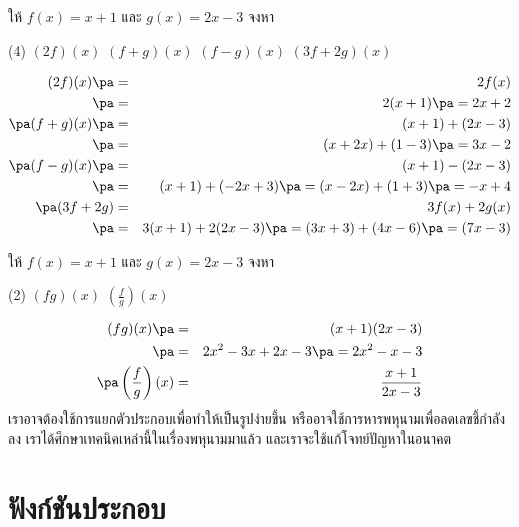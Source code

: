 \begin{frame}[t]
\begin{ex}
ให้ $f(x) = x+1$ และ $g(x) = 2x-3$ จงหา
\begin{tasks}(4)
\task $(2f)(x)$
\task $(f+g)(x)$ 
\task $(f - g)(x)$
\task $(3f + 2g)(x)$
\end{tasks}
\end{ex}
\begin{sol}
\begin{eqnarray*}
(2f)(x) \pa &=& 2f(x)  \\ \pa
&=& 2(x+1) \pa = 2x+2 \\ \pa
(f+g)(x) \pa &=& (x+1) + (2x-3)  \\ \pa
&=& (x+2x) + (1-3) \pa = 3x-2 \\ \pa
(f-g)(x) \pa &=& (x+1) - (2x-3) \\ \pa
&=& (x+1) + (-2x + 3) \pa = (x-2x) + (1+3) \pa = -x+4 \\ \pa
(3f + 2g) &=& 3f(x) + 2g(x) \\ \pa
&=& 3(x+1) + 2(2x-3) \pa = (3x+3) + (4x-6) \pa = (7x-3)
\end{eqnarray*}
\end{sol}
\end{frame}


\begin{frame}[t]
\begin{ex}
ให้ $f(x) = x+1$ และ $g(x) = 2x-3$ จงหา
\begin{tasks}(2)
\task $(fg)(x)$
\task $\left( \frac{f}{g} \right)(x)$
\end{tasks}
\end{ex}
\begin{sol}
\begin{eqnarray*}
(fg)(x) \pa &=& (x+1)(2x-3) \\ \pa
&=& 2x^2-3x+2x-3 \pa = 2x^2-x-3\\ \pa
\left(\frac{f}{g} \right)(x)&=& \frac{x+1}{2x-3}
\end{eqnarray*}
เราอาจต้องใช้การแยกตัวประกอบเพื่อทำให้เป็นรูปง่ายขึ้น หรืออาจใช้การหารพหุนามเพื่อลดเลขชี้กำลังลง เราได้ศึกษาเทคนิคเหล่านี้ในเรื่องพหุนามมาแล้ว และเราจะใช้แก้โจทย์ปัญหาในอนาคต
\end{sol}
\end{frame}


\section{ฟังก์ชันประกอบ}
\frame{\sectionpage}

